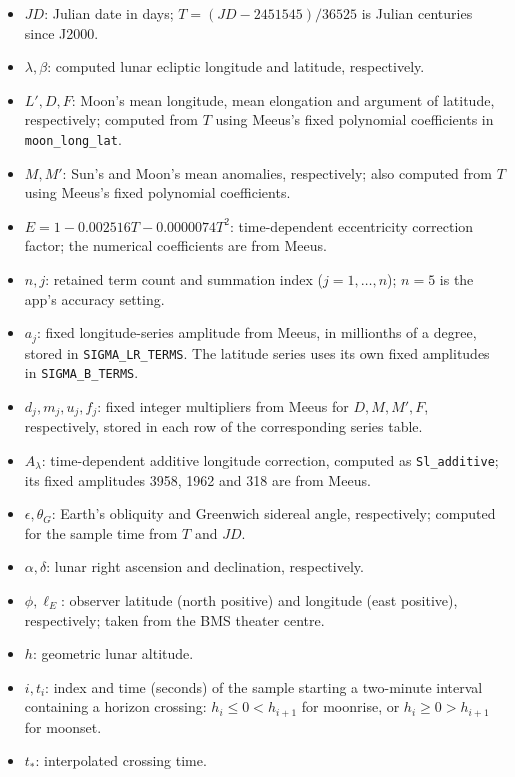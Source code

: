 \documentclass[10pt,a4paper]{amsart}
\begin{document}
\begin{itemize}
\setlength{\itemsep}{0pt}
\setlength{\parsep}{0pt}
\item $JD$: Julian date in days; $T=(JD-2451545)/36525$ is Julian centuries
since J2000.
\item $\lambda,\beta$: computed lunar ecliptic longitude and latitude,
respectively.
\item $L',D,F$: Moon's mean longitude, mean elongation and argument of
latitude, respectively; computed from $T$ using Meeus's fixed polynomial
coefficients in \texttt{moon\_long\_lat}.
\item $M,M'$: Sun's and Moon's mean anomalies, respectively; also computed
from $T$ using Meeus's fixed polynomial coefficients.
\item $E=1-0.002516T-0.0000074T^2$: time-dependent eccentricity correction
factor; the numerical coefficients are from Meeus.
\item $n,j$: retained term count and summation index ($j=1,\ldots,n$);
$n=5$ is the app's accuracy setting.
\item $a_j$: fixed longitude-series amplitude from Meeus, in millionths of
a degree, stored in \texttt{SIGMA\_LR\_TERMS}. The latitude series uses its
own fixed amplitudes in \texttt{SIGMA\_B\_TERMS}.
\item $d_j,m_j,u_j,f_j$: fixed integer multipliers from Meeus for
$D,M,M',F$, respectively, stored in each row of the corresponding series table.
\item $A_\lambda$: time-dependent additive longitude correction, computed
as \texttt{Sl\_additive}; its fixed amplitudes 3958, 1962 and 318 are from Meeus.
\item $\epsilon,\theta_G$: Earth's obliquity and Greenwich sidereal angle,
respectively; computed for the sample time from $T$ and $JD$.
\item $\alpha,\delta$: lunar right ascension and declination, respectively.
\item $\phi,\ell_E$: observer latitude (north positive) and longitude
(east positive), respectively; taken from the BMS theater centre.
\item $h$: geometric lunar altitude.
\item $i,t_i$: index and time (seconds) of the sample starting a two-minute
interval containing a horizon crossing: $h_i\leq0<h_{i+1}$ for moonrise,
or $h_i\geq0>h_{i+1}$ for moonset.
\item $t_*$: interpolated crossing time.
\end{itemize}
\end{document}
